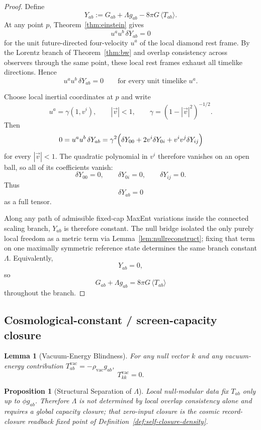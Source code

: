 \documentclass[11pt]{article}
\newtheorem{proposition}[theorem]{Proposition}
\newtheorem{lemma}[theorem]{Lemma}
\begin{document}
\begin{proof}
Define
\[
Y_{ab}:=G_{ab}+\Lambda g_{ab}-8\pi G\,\langle T_{ab}\rangle.
\]
At any point $p$, Theorem~\ref{thm:einstein} gives
\[
u^a u^b\,\delta Y_{ab}=0
\]
for the unit future-directed four-velocity $u^a$ of the local diamond rest frame. By the Lorentz branch of Theorem~\ref{thm:bw} and overlap consistency across observers through the same point, these local rest frames exhaust all timelike directions. Hence
\[
u^a u^b\,\delta Y_{ab}=0
\qquad
\text{for every unit timelike }u^a.
\]

Choose local inertial coordinates at $p$ and write
\[
u^a=\gamma(1,v^i),
\qquad
|\vec v|<1,
\qquad
\gamma=(1-|\vec v|^2)^{-1/2}.
\]
Then
\[
0=u^a u^b\,\delta Y_{ab}
=
\gamma^2\Bigl(\delta Y_{00}+2v^i\delta Y_{0i}+v^iv^j\delta Y_{ij}\Bigr)
\]
for every $|\vec v|<1$. The quadratic polynomial in $v^i$ therefore vanishes on an open ball, so all of its coefficients vanish:
\[
\delta Y_{00}=0,\qquad
\delta Y_{0i}=0,\qquad
\delta Y_{ij}=0.
\]
Thus
\[
\delta Y_{ab}=0
\]
as a full tensor.

Along any path of admissible fixed-cap MaxEnt variations inside the connected scaling branch, $Y_{ab}$ is therefore constant. The null bridge isolated the only purely local freedom as a metric term via Lemma~\ref{lem:nullreconstruct}; fixing that term on one maximally symmetric reference state determines the same branch constant $\Lambda$. Equivalently,
\[
Y_{ab}=0,
\]
so
\[
G_{ab}+\Lambda g_{ab}=8\pi G\,\langle T_{ab}\rangle
\]
throughout the branch.
\end{proof}

\subsection{Cosmological-constant / screen-capacity closure}

\begin{lemma}[Vacuum-Energy Blindness]\label{lem:vac}
For any null vector $k$ and any vacuum-energy contribution $T^{\mathrm{vac}}_{ab}=-\rho_{\mathrm{vac}}g_{ab}$,
\[
T^{\mathrm{vac}}_{kk}=0.
\]
\end{lemma}

\begin{proposition}[Structural Separation of $\Lambda$]\label{prop:lambda}
Local null-modular data fix $T_{ab}$ only up to $\phi g_{ab}$. Therefore $\Lambda$ is not determined by local overlap consistency alone and requires a global capacity closure; that zero-input closure is the cosmic record-closure readback fixed point of Definition~\ref{def:self-closure-density}.
\end{proposition}
\end{document}
